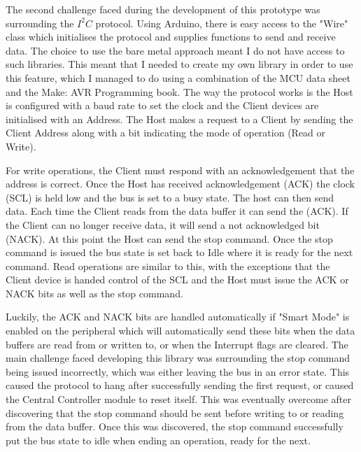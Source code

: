 \documentclass[11pt,a4paper,titlepage]{report}
\begin{document}
	The second challenge faced during the development of this prototype was surrounding the $I^{2}C$ protocol. Using Arduino, there is easy access to the "Wire" class which initialises the protocol and supplies functions to send and receive data. The choice to use the bare metal approach meant I do not have access to such libraries. This meant that I needed to create my own library in order to use this feature, which I managed to do using a combination of the MCU data sheet\cite{ATTINY1627} and the Make: AVR Programming book\cite{MAKE_AVR}. The way the protocol works is the Host is configured with a baud rate to set the clock and the Client devices are initialised with an Address. The Host makes a request to a Client by sending the Client Address along with a bit indicating the mode of operation (Read or Write). 
	
	For write operations, the Client must respond with an acknowledgement that the address is correct. Once the Host has received acknowledgement (ACK) the clock (SCL) is held low and the bus is set to a busy state. The host can then send data. Each time the Client reads from the data buffer it can send the (ACK). If the Client can no longer receive data, it will send a not acknowledged bit (NACK). At this point the Host can send the stop command. Once the stop command is issued the bus state is set back to Idle where it is ready for the next command. Read operations are similar to this, with the exceptions that the Client device is handed control of the SCL and the Host must issue the ACK or NACK bits as well as the stop command. 
	
	Luckily, the ACK and NACK bits are handled automatically if "Smart Mode" is enabled on the peripheral which will automatically send these bits when the data buffers are read from or written to, or when the Interrupt flags are cleared. The main challenge faced developing this library was surrounding the stop command being issued incorrectly, which was either leaving the bus in an error state. This caused the protocol to hang after successfully sending the first request, or caused the Central Controller module to reset itself. This was eventually overcome after discovering\cite{MICROCHIP_TWI} that the stop command should be sent before writing to or reading from the data buffer. Once this was discovered, the stop command successfully put the bus state to idle when ending an operation, ready for the next. 
	
\end{document}
